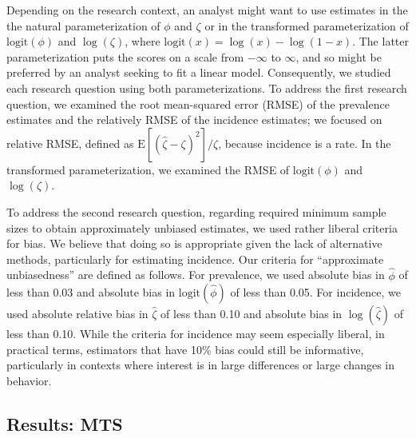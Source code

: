 \documentclass[man, noextraspace, floatsintext]{apa6}\usepackage[]{graphicx}\usepackage[]{color}
\newcommand{\E}{\text{E}}
\newcommand{\logit}{\text{logit}}
\begin{document}
Depending on the research context, an analyst might want to use estimates in the the natural parameterization of $\phi$ and $\zeta$ or in the transformed parameterization of $\logit(\phi)$ and $\log(\zeta)$, where $\logit(x) = \log(x) - \log (1 - x)$. 
The latter parameterization puts the scores on a scale from $-\infty$ to $\infty$, and so might be preferred by an analyst seeking to fit a linear model. 
Consequently, we studied each research question using both parameterizations. 
To address the first research question, we examined the root mean-squared error (RMSE) of the prevalence estimates and the relatively RMSE of the incidence estimates; we focused on relative RMSE, defined as $\E\left[\left(\hat\zeta - \zeta\right)^2\right] / \zeta$, because incidence is a rate. 
In the transformed parameterization, we examined the RMSE of $\logit(\phi)$ and $\log(\zeta)$.  

To address the second research question, regarding required minimum sample sizes to obtain approximately unbiased estimates, we used rather liberal criteria for bias. 
We believe that doing so is appropriate given the lack of alternative methods, particularly for estimating incidence. 
Our criteria for ``approximate unbiasedness'' are defined as follows. 
For prevalence, we used absolute bias in $\hat\phi$ of less than 0.03 and absolute bias in $\logit(\hat\phi)$ of less than 0.05. 
For incidence, we used absolute relative bias in $\hat\zeta$ of less than 0.10 and absolute bias in $\log(\hat\zeta)$ of less than 0.10. While the criteria for incidence may seem especially liberal, in practical terms, estimators that have 10\% bias could still be informative, particularly in contexts where interest is in large differences or large changes in behavior.



\subsection{Results: MTS}
\end{document}
